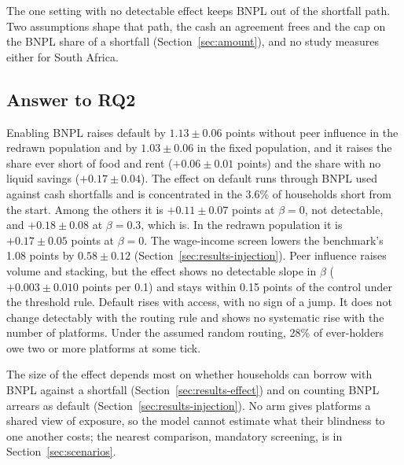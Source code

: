 The one setting with no detectable effect keeps \ac{BNPL} out of the shortfall path. Two assumptions
shape that path, the cash an agreement frees and the cap on the \ac{BNPL} share of a shortfall
(Section~\ref{sec:amount}), and no study measures either for South Africa.

\subsection{Answer to RQ2}
\label{sec:results-answer}

Enabling \ac{BNPL} raises
default by $1.13 \pm 0.06$ points without peer influence in the redrawn population and by
$1.03 \pm 0.06$ in the fixed population, and it raises the share ever
short of food and rent ($+0.06 \pm 0.01$ points) and the share with no liquid savings
($+0.17 \pm 0.04$). The effect on default runs through \ac{BNPL} used against cash shortfalls and
is concentrated in the 3.6\% of households short from the start. Among the others it is
$+0.11 \pm 0.07$ points at $\beta=0$, not detectable, and
$+0.18 \pm 0.08$ at $\beta=0.3$, which is. In the redrawn population it is
$+0.17 \pm 0.05$ points at $\beta=0$. The wage-income screen lowers the benchmark's 1.08 points by
$0.58 \pm 0.12$ (Section~\ref{sec:results-injection}). Peer influence raises volume and stacking, but the
effect shows no detectable slope in $\beta$
($+0.003 \pm 0.010$ points per 0.1) and stays within 0.15 points of the control under the
threshold rule. Default rises with access, with no sign of a jump. It does not change detectably with the routing rule
and shows no systematic rise with the number of platforms. Under the assumed random routing, 28\%
of ever-holders owe two or more platforms at some tick.

The size of the effect depends most on whether households can borrow with \ac{BNPL} against a
shortfall (Section~\ref{sec:results-effect}) and on counting \ac{BNPL} arrears as default
(Section~\ref{sec:results-injection}). No arm gives platforms a shared view of exposure, so the
model cannot estimate what their blindness to one another costs; the nearest comparison,
mandatory screening, is in Section~\ref{sec:scenarios}.

